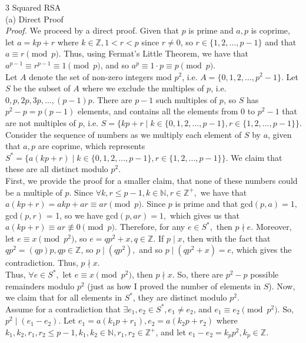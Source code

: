 \documentclass{article}
\begin{document}
{\Large 3 Squared RSA} \\[.5cm]
(a) Direct Proof \\[.2cm]
\textit{Proof.} We proceed by a direct proof. Given that $p$ is prime and $a,p$ is coprime, let $a = kp + r$ where $k\in\mathbb{Z}, 1<r<p$ since $r\neq0$, so $r\in\{1,2,...,p-1\}$ and that $a\equiv r\pmod{p}$. Thus, using Fermat's Little Theorem, we have that $a^{p-1}\equiv r^{p-1}\equiv1\pmod{p}$, and so $a^p\equiv1\cdot p\equiv p\pmod{p}$. \\[.1cm]
\indent Let $A$ denote the set of non-zero integers mod $p^2$, i.e. $A = \{0, 1, 2, ..., p^2 - 1\}$. Let $S$ be the subset of $A$ where we exclude the multiples of $p$, i.e. $0, p, 2p, 3p, ..., (p-1)p$. There are $p-1$ such multiples of $p$, so $S$ has $p^2 - p = p(p-1)$ elements, and contains all the elements from 0 to $p^2-1$ that are not multiples of $p$, i.e. $S = \big\{kp+r\mid k\in\{0,1,2,...,p-1\}, r\in\{1,2,...,p-1\}\big\}$. \\[.1cm]
\indent Consider the sequence of numbers as we multiply each element of $S$ by $a$, given that $a,p$ are coprime, which represents $S^* = \big\{a(kp+r)\mid k\in\{0,1,2,...,p-1\}, r\in\{1,2,...,p-1\}\big\}$. We claim that these are all distinct modulo $p^2$. \\[.1cm]
\indent First, we provide the proof for a smaller claim, that none of these numbers could be a multiple of $p$. Since $\forall k,r\leq p-1, k\in\mathbb{N}, r\in\mathbb{Z^+},$ we have that $a(kp+r) = akp + ar\equiv ar\pmod{p}.$ Since $p$ is prime and that gcd$(p,a) = 1,$ gcd$(p,r)$ = 1, so we have gcd$(p, ar) = 1,$ which gives us that $a(kp+r)\equiv ar\not\equiv0\pmod{p}.$ Therefore, for any $e\in S^*,$ then $p\nmid e.$ Moreover, let $e\equiv x\pmod{p^2}$, so $e = qp^2 + x, q\in\mathbb{Z}$. If $p\mid x$, then with the fact that $qp^2 = (qp)p, qp\in\mathbb{Z}$, so $p\mid(qp^2),$ and so $p\mid(qp^2 + x) = e$, which gives the contradiction. Thus, $p\nmid x$. \\[.1cm]
\indent Thus, $\forall e\in S^*,$ let $e\equiv x\pmod{p^2}$, then $p\nmid x$. So, there are $p^2 - p$ possible remainders modulo $p^2$ (just as how I proved the number of elements in $S$). Now, we claim that for all elements in $S^*$, they are distinct modulo $p^2$. \\[.1cm]
\indent Assume for a contradiction that $\exists e_1, e_2\in S^*, e_1\neq e_2$, and $e_1\equiv e_2\pmod{p^2}$. 
So, $p^2\mid(e_1-e_2).$
Let $e_1 = a(k_1p+r_1), e_2 = a(k_2p+r_2)$ where $k_1, k_2,r_1, r_2\leq p-1, k_1, k_2\in\mathbb{N}, r_1, r_2\in\mathbb{Z^+}$, and let $e_1-e_2 = k_pp^2, k_p\in\mathbb{Z}.$
\end{document}
